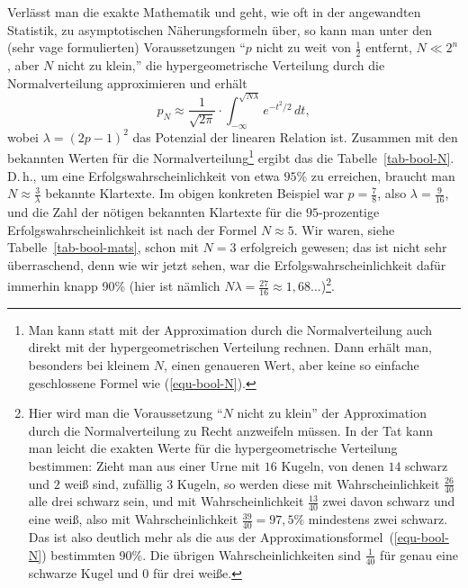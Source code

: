 \begin{refsegment}
Verlässt man die exakte Mathematik und geht, wie oft in der angewandten Statistik,
zu asymptotischen Näherungsformeln über, so kann man unter den (sehr vage
formulierten) Voraussetzungen
"`$p$ nicht zu weit von $\frac{1}{2}$ entfernt, $N \ll 2^n$, aber $N$ nicht
zu klein,"' die hypergeometrische Verteilung durch die
Normalverteilung approximieren und erhält
\begin{equation}\label{equ-bool-N}
  p_N \approx \frac{1}{\sqrt{2\pi}} \cdot
                      \int_{-\infty}^{\sqrt{N\lambda}} e^{-t^2/2}\,dt,
\end{equation}
wobei $\lambda = (2p - 1)^2$ das Potenzial der linearen Relation ist.
Zusammen mit den bekannten Werten für die Normalverteilung\footnote{%
   Man kann statt mit der Approximation durch die Normalverteilung auch direkt
   mit der hypergeometrischen
   Verteilung
   rechnen. Dann erhält man,
   besonders bei kleinem $N$, einen genaueren Wert, aber keine so
   einfache geschlossene Formel wie (\ref{equ-bool-N}).
} ergibt das die
Tabelle~\ref{tab-bool-N}. D.\,h., um eine Erfolgswahrscheinlichkeit von etwa
$95\%$ zu erreichen, braucht man $N \approx \frac{3}{\lambda}$ bekannte
Klartexte.
Im obigen konkreten Beispiel war $p = \frac{7}{8}$, also $\lambda = \frac{9}{16}$,
und die Zahl der nötigen bekannten Klartexte für die $95$-prozentige
Erfolgswahrscheinlichkeit ist nach der Formel $N \approx 5$. Wir waren,
siehe Tabelle~\ref{tab-bool-mats}, schon mit $N = 3$ erfolgreich gewesen;
das ist nicht sehr überraschend, denn wie wir jetzt sehen, war
die Erfolgswahrscheinlichkeit dafür immerhin knapp 90\% (hier ist nämlich
$N\lambda = \frac{27}{16} \approx 1,68\ldots$)\footnote{%
   Hier wird man die Voraussetzung "`$N$ nicht zu klein"' der Approximation
   durch die Normalverteilung zu Recht anzweifeln müssen.
   In der Tat kann man leicht die exakten Werte für die hypergeometrische
   Verteilung
   bestimmen:
   Zieht man aus einer Urne mit $16$ Kugeln, von denen $14$ schwarz und
   $2$ weiß sind, zufällig $3$ Kugeln, so werden diese mit Wahrscheinlichkeit
   $\frac{26}{40}$ alle drei schwarz sein, und mit Wahrscheinlichkeit
   $\frac{13}{40}$ zwei davon schwarz und eine weiß, also mit Wahrscheinlichkeit
   $\frac{39}{40} = 97,5\%$ mindestens zwei schwarz. Das ist also deutlich
   mehr als die aus der Approximationsformel~(\ref{equ-bool-N}) bestimmten 90\%.
   Die übrigen Wahrscheinlichkeiten sind $\frac{1}{40}$ für genau eine schwarze
   Kugel und $0$ für drei weiße.
}.


\end{refsegment}
